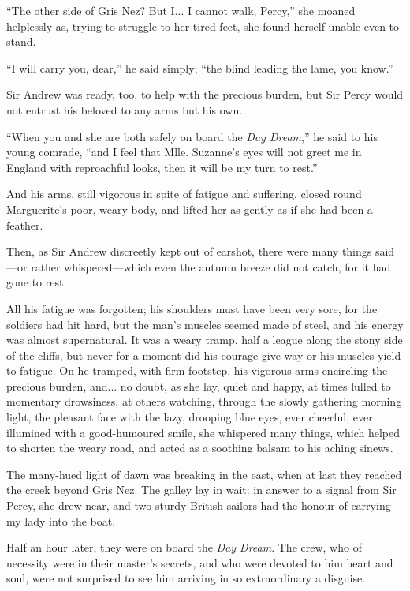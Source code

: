 \documentclass[paper=5.5in:8.5in,BCOR=7mm,twoside,DIV=calc,12pt,usegeometry,chapterprefix,endperiod,headings=big]{scrbook}
\begin{document}
\enquote{The other side of Gris Nez? But I... I cannot walk, Percy,} she moaned helplessly as, trying to struggle to her tired feet, she found herself unable even to stand.

\enquote{I will carry you, dear,} he said simply; \enquote{the blind leading the lame, you know.}

Sir Andrew was ready, too, to help with the precious burden, but Sir Percy would not entrust his beloved to any arms but his own.

\enquote{When you and she are both safely on board the \textit{Day Dream},} he said to his young comrade, \enquote{and I feel that Mlle. Suzanne's eyes will not greet me in England with reproachful looks, then it will be my turn to rest.}

And his arms, still vigorous in spite of fatigue and suffering, closed round Marguerite's poor, weary body, and lifted her as gently as if she had been a feather.

Then, as Sir Andrew discreetly kept out of earshot, there were many things said---or rather whispered---which even the autumn breeze did not catch, for it had gone to rest.

All his fatigue was forgotten; his shoulders must have been very sore, for the soldiers had hit hard, but the man's muscles seemed made of steel, and his energy was almost supernatural. It was a weary tramp, half a league along the stony side of the cliffs, but never for a moment did his courage give way or his muscles yield to fatigue. On he tramped, with firm footstep, his vigorous arms encircling the precious burden, and... no doubt, as she lay, quiet and happy, at times lulled to momentary drowsiness, at others watching, through the slowly gathering morning light, the pleasant face with the lazy, drooping blue eyes, ever cheerful, ever illumined with a good-humoured smile, she whispered many things, which helped to shorten the weary road, and acted as a soothing balsam to his aching sinews.

The many-hued light of dawn was breaking in the east, when at last they reached the creek beyond Gris Nez. The galley lay in wait: in answer to a signal from Sir Percy, she drew near, and two sturdy British sailors had the honour of carrying my lady into the boat.

Half an hour later, they were on board the \textit{Day Dream}. The crew, who of necessity were in their master's secrets, and who were devoted to him heart and soul, were not surprised to see him arriving in so extraordinary a disguise.
\end{document}
